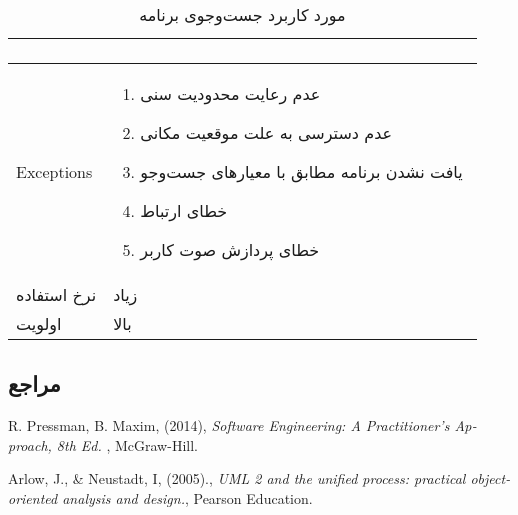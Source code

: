 {\begin{enumerate}[a)]
\begin{center}
\begin{table}[h!]
\begin{tabular}{|p{0.18\linewidth}|p{0.75\linewidth}|}
\begin{enumerate}[1.]
\end{enumerate}
		                   \\ 
		\hline
	Exceptions   &    
	     
\begin{enumerate}[1.]
	\item
	عدم رعایت محدودیت سنی 
	\item
	عدم دسترسی به علت موقعیت مکانی
	\item
	یافت نشدن برنامه مطابق با معیارهای جست‌و‌جو
	\item
	خطای ارتباط
	\item
	خطای پردازش صوت کاربر
\end{enumerate}
\\
	\hline
نرخ استفاده	&    زیاد        \\ 
	\hline	
	اولویت	&    بالا        \\ 
	\hline	
\end{tabular}
	\caption{مورد کاربرد جست‌وجوی برنامه}	
		\label{fig4-1}
\end{table}


\end{center}

 	

\end{enumerate}
 
	


\subsection*{مراجع}

\begin{latin}
	\begingroup
	\renewcommand{\section}[2]{}%
	
	\begin{thebibliography}{9}
		
		R. Pressman,   B. Maxim, (2014),
		\textit{Software Engineering: A Practitioner’s Approach, 8th Ed. },
		McGraw-Hill.

	Arlow, J., \& Neustadt, I, (2005).,
		\textit{UML 2 and the unified process: practical object-oriented analysis and design.},
		 Pearson Education.		
		
	\end{thebibliography}
	\endgroup
\end{latin}

}
